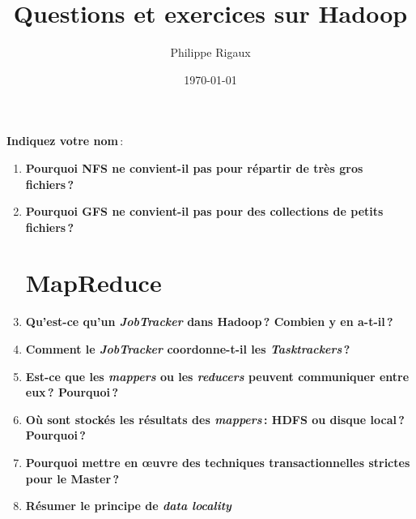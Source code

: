 \documentclass{article}
\title{Questions et exercices sur Hadoop}
\author{Philippe Rigaux}
\date{\today}
\begin{document}
\maketitle

\textbf{Indiquez votre nom}\,:


\begin{enumerate}

 \section{Fichiers distribués}

  \item \textbf{Pourquoi NFS ne convient-il pas pour répartir de très gros fichiers\,?}
  
  \vspace*{4cm}
  
  \item \textbf{Pourquoi GFS ne convient-il pas pour des collections de petits fichiers\,?}
  
  \vspace*{4cm}
  

\section{MapReduce}
\item \textbf{Qu'est-ce qu'un \textit{JobTracker} dans Hadoop\,? Combien y en a-t-il\,?}

\item \textbf{Comment le \textit{JobTracker} coordonne-t-il les \textit{Tasktrackers}\,?}

\item \textbf{Est-ce que  les \textit{mappers} ou les \textit{reducers} peuvent communiquer entre eux\,? Pourquoi\,?}

\item \textbf{Où sont stockés les résultats des \textit{mappers}\,: HDFS ou disque local\,? Pourquoi\,?}


  \item \textbf{Pourquoi mettre en {\oe}uvre des techniques transactionnelles strictes pour le Master\,?}
  
  \vspace*{4cm}
  \item \textbf{Résumer le principe de \textit{data locality}}
  
  \vspace*{4cm}
  

\end{enumerate}
\end{document}
